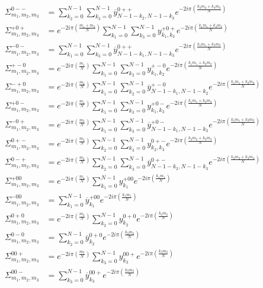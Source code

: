 \begin{align*}
\Sigma_{m_1,m_2,m_3}^{0--}&=
  \sum_{k_2=0}^{N-1}\sum_{k_3=0}^{N-1} \overline{y}^{0++}_{N-1-k_2,N-1-k_3} e^{-2i\pi\left(\frac{k_2m_2+k_3m_3}{N}\right)} \\
\Sigma_{m_1,m_2,m_3}^{+0+}&=
  e^{-2i\pi\left(\frac{m_1+m_3}{N}\right)} \sum_{k_1=0}^{N-1}\sum_{k_3=0}^{N-1} y^{+0+}_{k_1,k_3} e^{-2i\pi\left(\frac{k_1m_1+k_3m_3}{N}\right)} \\
\Sigma_{m_1,m_2,m_3}^{-0-}&=
  \sum_{k_1=0}^{N-1}\sum_{k_3=0}^{N-1} \overline{y}^{0++}_{N-1-k_1,N-1-k_3} e^{-2i\pi\left(\frac{k_1m_1+k_3m_3}{N}\right)} \\
\Sigma_{m_1,m_2,m_3}^{+-0}&=
  e^{-2i\pi\left(\frac{m_1}{N}\right)} \sum_{k_1=0}^{N-1}\sum_{k_2=0}^{N-1} y^{+-0}_{k_1,k_2} e^{-2i\pi\left(\frac{k_1m_1+k_2m_2}{N}\right)} \\
\Sigma_{m_1,m_2,m_3}^{-+0}&=
  e^{-2i\pi\left(\frac{m_2}{N}\right)} \sum_{k_1=0}^{N-1}\sum_{k_2=0}^{N-1} \overline{y}^{+-0}_{N-1-k_1,N-1-k_2} e^{-2i\pi\left(\frac{k_1m_1+k_2m_2}{N}\right)} \\
\Sigma_{m_1,m_2,m_3}^{+0-}&=
  e^{-2i\pi\left(\frac{m_1}{N}\right)} \sum_{k_1=0}^{N-1}\sum_{k_3=0}^{N-1} y^{+0-}_{k_1,k_3} e^{-2i\pi\left(\frac{k_1m_1+k_3m_3}{N}\right)} \\
\Sigma_{m_1,m_2,m_3}^{-0+}&=
  e^{-2i\pi\left(\frac{m_3}{N}\right)} \sum_{k_1=0}^{N-1}\sum_{k_3=0}^{N-1} \overline{y}^{+0-}_{N-1-k_1,N-1-k_3} e^{-2i\pi\left(\frac{k_1m_1+k_3m_3}{N}\right)} \\
\Sigma_{m_1,m_2,m_3}^{0+-}&=
  e^{-2i\pi\left(\frac{m_2}{N}\right)} \sum_{k_2=0}^{N-1}\sum_{k_3=0}^{N-1} y^{0+-}_{k_2,k_3} e^{-2i\pi\left(\frac{k_2m_2+k_3m_3}{N}\right)} \\
\Sigma_{m_1,m_2,m_3}^{0-+}&=
  e^{-2i\pi\left(\frac{m_2}{N}\right)} \sum_{k_2=0}^{N-1}\sum_{k_3=0}^{N-1} \overline{y}^{0+-}_{N-1-k_2,N-1-k_3} e^{-2i\pi\left(\frac{k_2m_2+k_3m_3}{N}\right)} \\
\Sigma_{m_1,m_2,m_3}^{+00}&=
  e^{-2i\pi\left(\frac{m_1}{N}\right)} \sum_{k_1=0}^{N-1} y^{+00}_{k_1} e^{-2i\pi\left(\frac{k_1m_1}{N}\right)} \\
\Sigma_{m_1,m_2,m_3}^{-00}&=
  \sum_{k_1=0}^{N-1} \overline{y}^{+00}_{k_1} e^{-2i\pi\left(\frac{k_1m_1}{N}\right)} \\
\Sigma_{m_1,m_2,m_3}^{0+0}&=
  e^{-2i\pi\left(\frac{m_2}{N}\right)} \sum_{k_2=0}^{N-1} y^{0+0}_{k_2} e^{-2i\pi\left(\frac{k_2m_2}{N}\right)} \\
\Sigma_{m_1,m_2,m_3}^{0-0}&=
  \sum_{k_2=0}^{N-1} \overline{y}^{0+0}_{k_2} e^{-2i\pi\left(\frac{k_2m_2}{N}\right)} \\
\Sigma_{m_1,m_2,m_3}^{00+}&=
  e^{-2i\pi\left(\frac{m_3}{N}\right)} \sum_{k_3=0}^{N-1} y^{00+}_{k_3} e^{-2i\pi\left(\frac{k_3m_3}{N}\right)} \\
\Sigma_{m_1,m_2,m_3}^{00-}&=
  \sum_{k_3=0}^{N-1} \overline{y}^{00+}_{k_3} e^{-2i\pi\left(\frac{k_3m_3}{N}\right)} \\
\end{align*}

